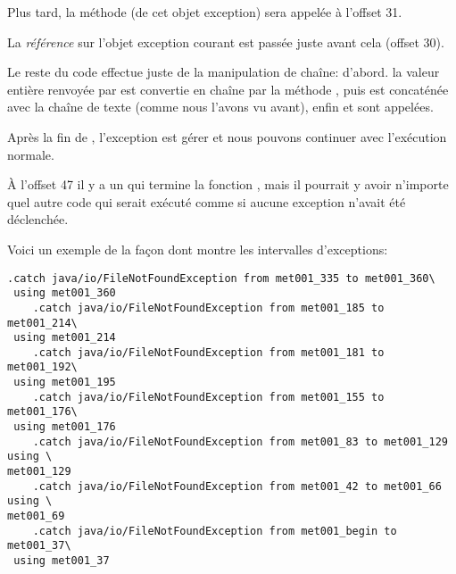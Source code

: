 Plus tard, la méthode  (de cet objet exception) sera appelée à l'offset 31.

La \emph{référence} sur l'objet exception courant est passée juste avant cela (offset 30).

Le reste du code effectue juste de la manipulation de chaîne:
d'abord. la valeur entière renvoyée par  est convertie en chaîne par
la méthode , puis est concaténée avec la chaîne de texte 
(comme nous l'avons vu avant), enfin  et  sont
appelées.

Après la fin de , l'exception est gérer et nous pouvons continuer
avec l'exécution normale.

À l'offset 47 il y a un  qui termine la fonction \main, mais il pourrait
y avoir n'importe quel autre code qui serait exécuté comme si aucune exception n'avait
été déclenchée.

Voici un exemple de la façon dont \IDA montre les intervalles d'exceptions:


\begin{lstlisting}[caption=tiré d'un fichier .class quelconque trouvé sur mon ordinateur]
    .catch java/io/FileNotFoundException from met001_335 to met001_360\
 using met001_360
    .catch java/io/FileNotFoundException from met001_185 to met001_214\
 using met001_214
    .catch java/io/FileNotFoundException from met001_181 to met001_192\
 using met001_195
    .catch java/io/FileNotFoundException from met001_155 to met001_176\
 using met001_176
    .catch java/io/FileNotFoundException from met001_83 to met001_129 using \
met001_129
    .catch java/io/FileNotFoundException from met001_42 to met001_66 using \
met001_69
    .catch java/io/FileNotFoundException from met001_begin to met001_37\
 using met001_37
\end{lstlisting}
